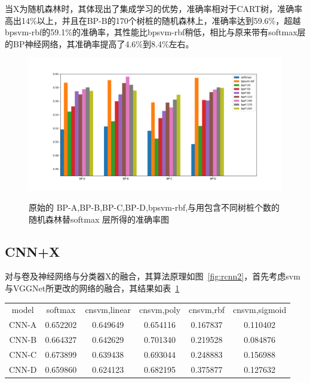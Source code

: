 当X为随机森林时，其体现出了集成学习的优势，准确率相对于CART树，准确率高出14\%以上，并且在BP-B的170个树桩的随机森林上，准确率达到59.6\%，超越bpsvm-rbf的59.1\%的准确率，其性能比bpsvm-rbf稍低，相比与原来带有softmax层的BP神经网络，其准确率提高了4.6\%到8.4\%左右。

\begin{figure}[htb]
\centering
\includegraphics[scale=0.5]{../figures/NN_rf1.png} \\
\caption{原始的 BP-A,BP-B,BP-C,BP-D,bpsvm-rbf,与用包含不同树桩个数的随机森林替softmax 层所得的准确率图}
\label{fig:bpx3}
\end{figure}


\subsection{CNN+X}
对与卷及神经网络与分类器X的融合，其算法原理如图~\ref{fig:rcnn2}，首先考虑svm与VGGNet所更改的网络的融合，其结果如表~\ref{table:cnnx1}
\begin{table}[htb]
\centering
\begin{tabular}{cccccc}
\toprule[2pt]
model & softmax & cnsvm,linear & cnsvm,poly & cnsvm,rbf & cnsvm,sigmoid \\ 
CNN-A & 0.652202 & 0.649649 & 0.654116 & 0.167837 & 0.110402\\ 
CNN-B & 0.664327 & 0.642629 & 0.701340 & 0.219528 & 0.084876\\ 
CNN-C & 0.673899 & 0.639438 & 0.693044 & 0.248883 & 0.156988\\ 
CNN-D & 0.659860 & 0.624123 & 0.682195 & 0.375877 & 0.127632\\ 
\bottomrule[2pt]
\end{tabular} 
\label{table:cnnx1}
\end{table}


